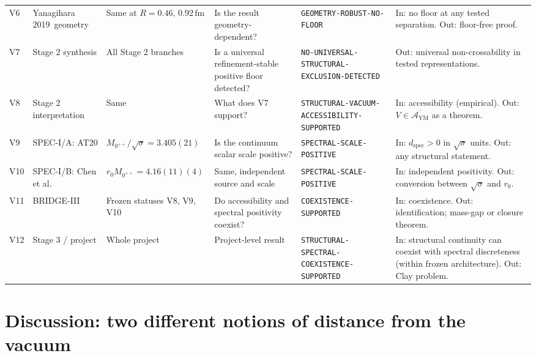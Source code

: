 \documentclass[11pt,a4paper]{article}
\theoremstyle{definition}
\theoremstyle{remark}
\newcommand{\dspec}{d_{\mathrm{spec}}}
\newcommand{\AYM}{\mathcal{A}_{\mathrm{YM}}}
\newcommand{\sqs}{\sqrt{\sigma}}
\begin{document}
\begin{landscape}
{\begin{longtable}{@{}l>{\raggedright\arraybackslash}p{3.3cm}>{\raggedright\arraybackslash}p{3.8cm}>{\raggedright\arraybackslash}p{4.4cm}>{\raggedright\arraybackslash}p{4.6cm}>{\raggedright\arraybackslash}p{5.2cm}@{}}
V6 & Yanagihara 2019\ geometry & Same at $R=0.46,\,0.92$\,fm & Is the result geometry-dependent? & \texttt{GEOMETRY-\allowbreak{}ROBUST-\allowbreak{}NO-\allowbreak{}FLOOR} & In: no floor at any tested separation. Out: floor-free proof.\\[3pt]
V7 & Stage 2 synthesis & All Stage 2 branches & Is a universal refinement-stable positive floor detected? & \texttt{NO-\allowbreak{}UNIVERSAL-\allowbreak{}STRUCTURAL-\allowbreak{}EXCLUSION-\allowbreak{}DETECTED} & Out: universal non-crossability in tested representations.\\[3pt]
V8 & Stage 2 interpretation & Same & What does V7 support? & \texttt{STRUCTURAL-\allowbreak{}VACUUM-\allowbreak{}ACCESSIBILITY-\allowbreak{}SUPPORTED} & In: accessibility (empirical). Out: $V\in\overline{\AYM}$ as a theorem.\\[3pt]
V9 & SPEC-I/A: AT20 \cite{AT20} & $M_{0^{++}}/\sqs=3.405(21)$ & Is the continuum scalar scale positive? & \texttt{SPECTRAL-\allowbreak{}SCALE-\allowbreak{}POSITIVE} & In: $\dspec>0$ in $\sqs$ units. Out: any structural statement.\\[3pt]
V10 & SPEC-I/B: Chen et al.\ \cite{Chen06} & $r_0M_{0^{++}}=4.16(11)(4)$ & Same, independent source and scale & \texttt{SPECTRAL-\allowbreak{}SCALE-\allowbreak{}POSITIVE} & In: independent positivity. Out: conversion between $\sqs$ and $r_0$.\\[3pt]
V11 & BRIDGE-III & Frozen statuses V8, V9, V10 & Do accessibility and spectral positivity coexist? & \texttt{COEXISTENCE-\allowbreak{}SUPPORTED} & In: coexistence. Out: identification; mass-gap or closure theorem.\\[3pt]
V12 & Stage 3 / project & Whole project & Project-level result & \texttt{STRUCTURAL-\allowbreak{}SPECTRAL-\allowbreak{}COEXISTENCE-\allowbreak{}SUPPORTED} & In: structural continuity can coexist with spectral discreteness (within frozen architecture). Out: Clay problem.\\[3pt]
\end{longtable}}
\end{landscape}


\section{Discussion: two different notions of distance from the vacuum}\label{sec:discussion}
\end{document}
